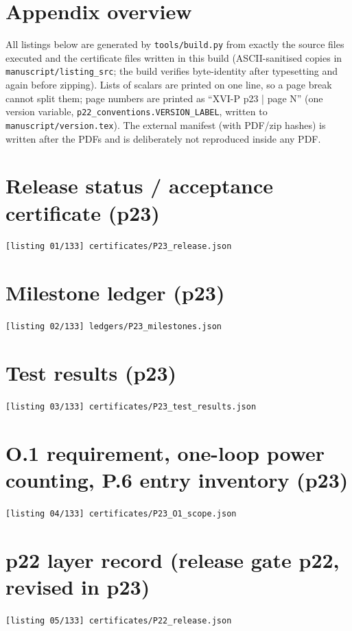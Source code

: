 \section{Appendix overview}
All listings below are generated by \texttt{tools/build.py} from exactly the source files executed and the certificate files written in this build (ASCII-sanitised copies in \texttt{manuscript/listing\_src}; the build verifies byte-identity after typesetting and again before zipping). Lists of scalars are printed on one line, so a page break cannot split them; page numbers are printed as ``XVI-P p23 | page N'' (one version variable, \texttt{p22\_conventions.VERSION\_LABEL}, written to \texttt{manuscript/version.tex}). The external manifest (with PDF/zip hashes) is written after the PDFs and is deliberately not reproduced inside any PDF.

\section{Release status / acceptance certificate (p23)}
\noindent\texttt{[listing 01/133] certificates/P23\_release.json}
{\scriptsize}

\section{Milestone ledger (p23)}
\noindent\texttt{[listing 02/133] ledgers/P23\_milestones.json}
{\scriptsize}

\section{Test results (p23)}
\noindent\texttt{[listing 03/133] certificates/P23\_test\_results.json}
{\scriptsize}

\section{O.1 requirement, one-loop power counting, P.6 entry inventory (p23)}
\noindent\texttt{[listing 04/133] certificates/P23\_O1\_scope.json}
{\scriptsize}

\section{p22 layer record (release gate p22, revised in p23)}
\noindent\texttt{[listing 05/133] certificates/P22\_release.json}
{\scriptsize}

